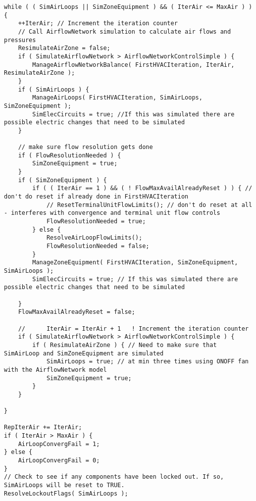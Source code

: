 \begin{lstlisting}
while ( ( SimAirLoops || SimZoneEquipment ) && ( IterAir <= MaxAir ) ) {
	++IterAir; // Increment the iteration counter
	// Call AirflowNetwork simulation to calculate air flows and pressures
	ResimulateAirZone = false;
	if ( SimulateAirflowNetwork > AirflowNetworkControlSimple ) {
		ManageAirflowNetworkBalance( FirstHVACIteration, IterAir, ResimulateAirZone );
	}
	if ( SimAirLoops ) {
		ManageAirLoops( FirstHVACIteration, SimAirLoops, SimZoneEquipment );
		SimElecCircuits = true; //If this was simulated there are possible electric changes that need to be simulated
	}

	// make sure flow resolution gets done
	if ( FlowResolutionNeeded ) {
		SimZoneEquipment = true;
	}
	if ( SimZoneEquipment ) {
		if ( ( IterAir == 1 ) && ( ! FlowMaxAvailAlreadyReset ) ) { // don't do reset if already done in FirstHVACIteration
			// ResetTerminalUnitFlowLimits(); // don't do reset at all - interferes with convergence and terminal unit flow controls
			FlowResolutionNeeded = true;
		} else {
			ResolveAirLoopFlowLimits();
			FlowResolutionNeeded = false;
		}
		ManageZoneEquipment( FirstHVACIteration, SimZoneEquipment, SimAirLoops );
		SimElecCircuits = true; // If this was simulated there are possible electric changes that need to be simulated

	}
	FlowMaxAvailAlreadyReset = false;

	//      IterAir = IterAir + 1   ! Increment the iteration counter
	if ( SimulateAirflowNetwork > AirflowNetworkControlSimple ) {
		if ( ResimulateAirZone ) { // Need to make sure that SimAirLoop and SimZoneEquipment are simulated
			SimAirLoops = true; // at min three times using ONOFF fan with the AirflowNetwork model
			SimZoneEquipment = true;
		}
	}

}

RepIterAir += IterAir;
if ( IterAir > MaxAir ) {
	AirLoopConvergFail = 1;
} else {
	AirLoopConvergFail = 0;
}
// Check to see if any components have been locked out. If so, SimAirLoops will be reset to TRUE.
ResolveLockoutFlags( SimAirLoops );
\end{lstlisting}

